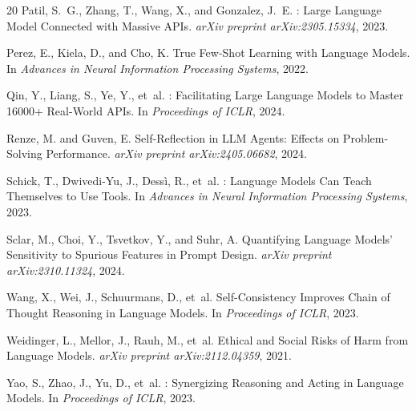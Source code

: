 \documentclass[11pt]{article}
\begin{document}
\begin{thebibliography}{20}
Patil, S.~G., Zhang, T., Wang, X., and Gonzalez, J.~E.
: Large Language Model Connected with Massive {APIs}.
\newblock \textit{arXiv preprint arXiv:2305.15334}, 2023.

Perez, E., Kiela, D., and Cho, K.
\newblock True Few-Shot Learning with Language Models.
\newblock In \textit{Advances in Neural Information Processing Systems}, 2022.

Qin, Y., Liang, S., Ye, Y., et~al.
: Facilitating Large Language Models to Master 16000+
  Real-World {APIs}.
\newblock In \textit{Proceedings of ICLR}, 2024.

Renze, M. and Guven, E.
\newblock Self-Reflection in {LLM} Agents: Effects on Problem-Solving
  Performance.
\newblock \textit{arXiv preprint arXiv:2405.06682}, 2024.

Schick, T., Dwivedi-Yu, J., Dess{\`i}, R., et~al.
: Language Models Can Teach Themselves to Use Tools.
\newblock In \textit{Advances in Neural Information Processing Systems}, 2023.

Sclar, M., Choi, Y., Tsvetkov, Y., and Suhr, A.
\newblock Quantifying Language Models' Sensitivity to Spurious Features in
  Prompt Design.
\newblock \textit{arXiv preprint arXiv:2310.11324}, 2024.

Wang, X., Wei, J., Schuurmans, D., et~al.
\newblock Self-Consistency Improves Chain of Thought Reasoning in Language
  Models.
\newblock In \textit{Proceedings of ICLR}, 2023.

Weidinger, L., Mellor, J., Rauh, M., et~al.
\newblock Ethical and Social Risks of Harm from Language Models.
\newblock \textit{arXiv preprint arXiv:2112.04359}, 2021.

Yao, S., Zhao, J., Yu, D., et~al.
: Synergizing Reasoning and Acting in Language Models.
\newblock In \textit{Proceedings of ICLR}, 2023.

\end{thebibliography}

\appendix
\end{document}

